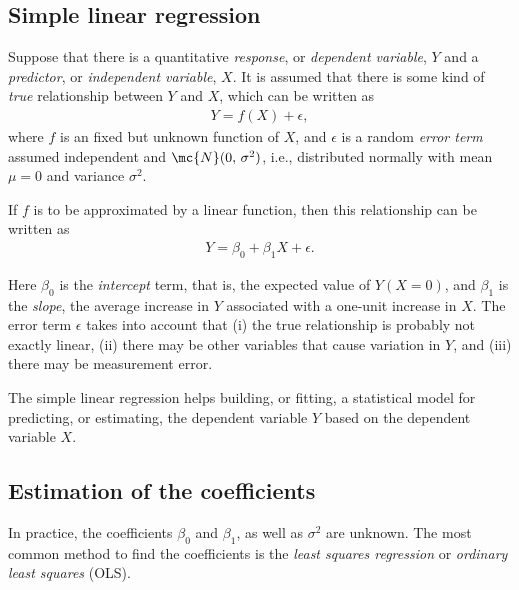 \subsection{Simple linear regression}\label{sec:simple-regression}
\nocite{James2006} \nocite{Dalgaard2008}

Suppose that there is a quantitative \emph{response}, or \emph{dependent variable}, $Y$ and a \emph{predictor}, or \emph{independent variable}, $X$. It is assumed that there is some kind of \emph{true} relationship between $Y$ and $X$, which can be written as
\begin{align}
	Y = f(X) + \epsilon,
\end{align}
where $f$ is an fixed but unknown function of $X$, and $\epsilon$ is a random \emph{error term} assumed independent and $\mc{N}(0, \, \sigma^{2})$, i.e., distributed normally  with mean $\mu = 0$ and variance $\sigma^{2}$. %

If $f$ is to be approximated by a linear function, then this relationship can be written as
\begin{align}\label{eq:lm-model}
	Y = \beta_{0} + \beta_{1} X + \epsilon.
\end{align}

Here $\beta_{0}$ is the \emph{intercept} term, that is, the expected value of $Y(X = 0)$, and $\beta_{1}$ is the \emph{slope}, the average increase in $Y$ associated with a one-unit increase in $X$. The error term $\epsilon$ takes into account that (i) the true relationship is probably not exactly linear, (ii) there may be other variables that cause variation in $Y$, and (iii) there may be measurement error.

\bigskip
The simple linear regression helps building, or fitting, a statistical model for predicting, or estimating, the dependent variable $Y$ based on the dependent variable $X$.

\subsection{Estimation of the coefficients}\label{sec:lm-coefs}

In practice, the coefficients $\beta_{0}$ and $\beta_{1}$, as well as
$\sigma^{2}$ are unknown. The most common method to find the coefficients is the \emph{least squares regression} or \emph{ordinary least squares} (OLS).

